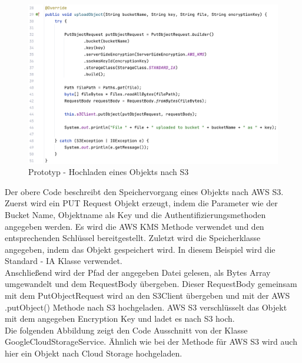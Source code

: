 \begin{figure}[h]
	\centering
	\includegraphics[width=15cm,keepaspectratio]{Pictures/UploadObjectAWS.png}
	\caption{Prototyp - Hochladen eines Objekts nach S3}
\end{figure}

\newpage

Der obere Code beschreibt den Speichervorgang eines Objekts nach AWS S3. Zuerst wird ein PUT Request Objekt erzeugt, indem die Parameter wie der Bucket Name, Objektname als Key und die Authentifizierungsmethoden angegeben werden. Es wird die AWS KMS Methode verwendet und den entsprechenden Schlüssel bereitgestellt. Zuletzt wird die Speicherklasse angegeben, indem das Objekt gespeichert wird. In diesem Beispiel wird die Standard - IA Klasse verwendet.\\

Anschließend wird der Pfad der angegeben Datei gelesen, als Bytes Array umgewandelt und dem RequestBody übergeben. Dieser RequestBody gemeinsam mit dem PutObjectRequest wird an den S3Client übergeben und mit der AWS .putObject() Methode nach S3 hochgeladen. AWS S3 verschlüsselt das Objekt mit dem angegeben Encryption Key und ladet es nach S3 hoch.\\

Die folgenden Abbildung zeigt den Code Ausschnitt von der Klasse GoogleCloudStorageService. Ähnlich wie bei der Methode für AWS S3 wird auch hier ein Objekt nach Cloud Storage hochgeladen. 

